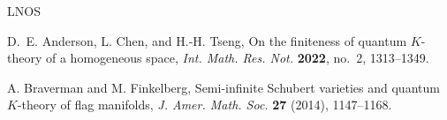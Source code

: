 \documentclass[11pt,a4paper,reqno,dvipdfmx]{amsart}
\numberwithin{equation}{section}
\theoremstyle{plain}
\theoremstyle{definition}
\theoremstyle{remark}
\begin{document}
\begin{thebibliography}{LNOS}

D.~E. Anderson, L. Chen, and H.-H. Tseng, 
On the finiteness of quantum $K$-theory of a homogeneous space, 
{\it Int. Math. Res. Not.} {\bf 2022}, no.~2, 1313--1349.

%
%

A. Braverman and M. Finkelberg, 
Semi-infinite Schubert varieties and quantum $K$-theory of flag manifolds, 
\textit{J. Amer. Math. Soc.} \textbf{27} (2014), 1147--1168. 

%
%
%
%
%
%
%
%


\end{thebibliography}
\end{document}
